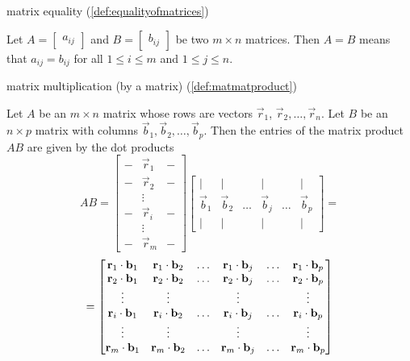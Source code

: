 \documentclass{ximera}
\begin{document}
matrix equality (\ref{def:equalityofmatrices})
\begin{expandable}
    Let $A=\begin{bmatrix} a_{ij}\end{bmatrix}$ and $B=\begin{bmatrix} b_{ij}\end{bmatrix}$ be two $m \times n$ matrices. Then $A=B$ means
that $a_{ij}=b_{ij}$ for all $1\leq i\leq m$ and 
$1\leq j\leq n$.
\end{expandable}


matrix multiplication (by a matrix) (\ref{def:matmatproduct})
\begin{expandable}
    Let $A$ be an $m\times n$ matrix whose rows are vectors $\vec{r}_1$, $\vec{r}_2,\ldots ,\vec{r}_n$.  Let $B$ be an $n\times p$ matrix with columns $\vec{b}_1, \vec{b}_2, \ldots, \vec{b}_p$.  Then the entries of the matrix product $AB$ are given by the dot products
$$AB=\begin{bmatrix}-&\vec{r}_1&-\\-&\vec{r}_2&-\\ &\vdots & \\-&\vec{r}_i &-\\ &\vdots& \\-&\vec{r}_m&-\end{bmatrix}\begin{bmatrix}|&|&&|&&|\\\vec{b}_1& \vec{b}_2 &\ldots  & \vec{b}_j&\ldots& \vec{b}_p\\|&|&&|&&|\end{bmatrix}=$$
$$=\begin{bmatrix}\mathbf{r}_1\cdot \mathbf{b}_1&\mathbf{r}_1\cdot \mathbf{b}_2&\ldots&\mathbf{r}_1\cdot \mathbf{b}_j&\ldots &\mathbf{r}_1\cdot \mathbf{b}_p\\\mathbf{r}_2\cdot \mathbf{b}_1&\mathbf{r}_2\cdot \mathbf{b}_2&\ldots&\mathbf{r}_2\cdot \mathbf{b}_j&\ldots &\mathbf{r}_2\cdot \mathbf{b}_p\\\vdots&\vdots&&\vdots&&\vdots\\\mathbf{r}_i\cdot \mathbf{b}_1&\mathbf{r}_i\cdot \mathbf{b}_2&\ldots&\mathbf{r}_i\cdot \mathbf{b}_j&\ldots &\mathbf{r}_i\cdot \mathbf{b}_p\\\vdots&\vdots&&\vdots&&\vdots\\\mathbf{r}_m\cdot \mathbf{b}_1&\mathbf{r}_m\cdot \mathbf{b}_2&\ldots&\mathbf{r}_m\cdot \mathbf{b}_j&\ldots &\mathbf{r}_m\cdot \mathbf{b}_p\end{bmatrix}
$$
\end{expandable}
\end{document}
